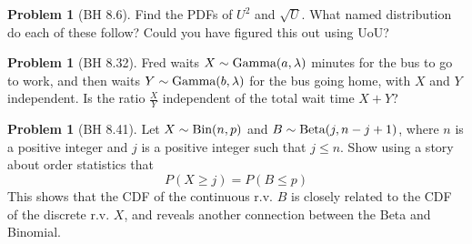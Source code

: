 \documentclass[11pt]{article}
\theoremstyle{definition}
\newtheorem{prob}[theo]{\color{Maroon} Problem}
\theoremstyle{remark}
\newcommand{\Bin}{\textnormal{Bin}}
\newcommand{\Beta}{\textnormal{Beta}}
\newcommand{\Gam}{\textnormal{Gamma}}
\begin{document}
\begin{prob}[BH 8.6] Find the PDFs of $U^2$ and $\sqrt{U}$. What named distribution do each of these follow? Could you have figured this out using UoU?
\end{prob}

\vspace{4 in}





\begin{prob}[BH 8.32] Fred waits $X \sim \Gam(a,\lambda)$ minutes for the bus to go to work, and then waits $Y \sim \Gam(b,\lambda)$ for the bus going home, with $X$ and $Y$ independent.  Is the ratio $\frac{X}{Y}$ independent of the total wait time $X + Y$?
\end{prob}



\pagebreak

\begin{prob}[BH 8.41]
Let $X \sim \Bin(n,p)$ and $B \sim \Beta(j, n-j + 1)$, where $n$ is a positive integer and $j$ is a positive integer such that $j \leq n$. Show using a story about order statistics that 
\[P(X \geq j) = P(B \leq p)\]
This shows that the CDF of the continuous r.v. $B$ is closely related to the CDF of the discrete r.v. $X$, and reveals another connection between the Beta and Binomial. 
\end{prob}
\end{document}
